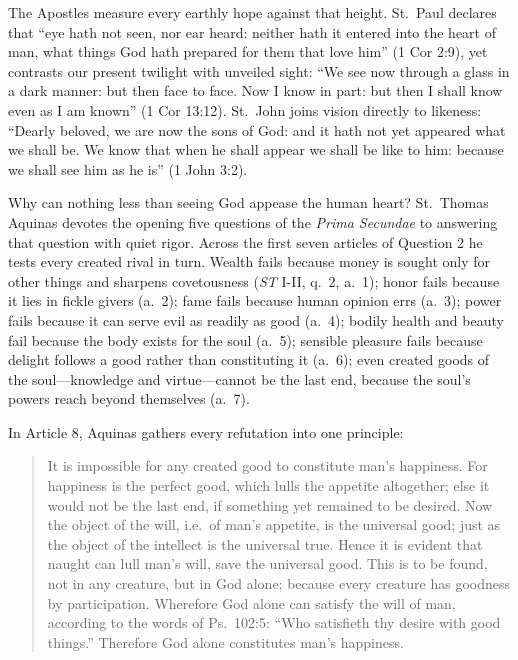 The Apostles measure every earthly hope against that height. St.\ Paul declares that ``eye hath not seen, nor ear heard: neither hath it entered into the heart of man, what things God hath prepared for them that love him'' (1 Cor 2:9), yet contrasts our present twilight with unveiled sight: ``We see now through a glass in a dark manner: but then face to face. Now I know in part: but then I shall know even as I am known'' (1 Cor 13:12). St.\ John joins vision directly to likeness: ``Dearly beloved, we are now the sons of God: and it hath not yet appeared what we shall be. We know that when he shall appear we shall be like to him: because we shall see him as he is'' (1 John 3:2).

Why can nothing less than seeing God appease the human heart? St.\ Thomas Aquinas devotes the opening five questions of the \textit{Prima Secundae} to answering that question with quiet rigor. Across the first seven articles of Question 2 he tests every created rival in turn. Wealth fails because money is sought only for other things and sharpens covetousness (\textit{ST} I-II, q.\ 2, a.\ 1); honor fails because it lies in fickle givers (a.\ 2); fame fails because human opinion errs (a.\ 3); power fails because it can serve evil as readily as good (a.\ 4); bodily health and beauty fail because the body exists for the soul (a.\ 5); sensible pleasure fails because delight follows a good rather than constituting it (a.\ 6); even created goods of the soul---knowledge and virtue---cannot be the last end, because the soul's powers reach beyond themselves (a.\ 7).

In Article 8, Aquinas gathers every refutation into one principle:

\begin{quote}
It is impossible for any created good to constitute man's happiness. For happiness is the perfect good, which lulls the appetite altogether; else it would not be the last end, if something yet remained to be desired. Now the object of the will, i.e.\ of man's appetite, is the universal good; just as the object of the intellect is the universal true. Hence it is evident that naught can lull man's will, save the universal good. This is to be found, not in any creature, but in God alone; because every creature has goodness by participation. Wherefore God alone can satisfy the will of man, according to the words of Ps.\ 102:5: ``Who satisfieth thy desire with good things.'' Therefore God alone constitutes man's happiness.
\end{quote}

